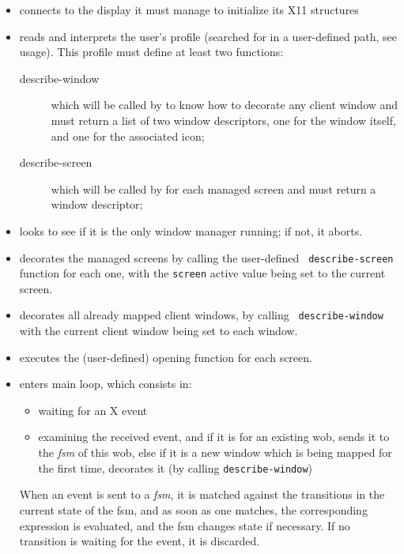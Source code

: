 \begin{itemize}

\item connects to the display it must manage to initialize its X11 structures

\item reads and interprets the user's {\WOOL} profile (searched for in a
user-defined path, see usage). This profile must define at least two
{\WOOL} functions:

\begin{description}
\item[describe-window] which will be called by {\GWM} to know how to decorate
any client window and must return a list of two window descriptors, one for
the window itself, and one for the associated icon;
\item[describe-screen] which will be called by {\GWM} for each managed
screen and must return a window descriptor;
\end{description}

\item looks to see if it is the only window manager running; if not, it
aborts.

\item decorates the managed screens by calling the user-defined {\tt
describe-screen} function for each one, with the \verb"screen" active value
being set to the current screen.

\item decorates all already mapped client windows, by calling {\tt
describe-window} with the current client window being set to each window.

\item executes the (user-defined) opening function for each screen.

\item enters {\GWM} main loop, which consists in:

\begin{itemize}
\item waiting for an X event

\item examining the received event, and if it is for an existing wob, sends
it to the {\em fsm\/} of this wob, else if it is a new window which is being
mapped for the first time, decorates it (by calling {\tt describe-window})
\end{itemize}

When an event is sent to a {\em fsm}, it is matched against the
transitions in the current state of the fsm, and as soon as one matches, the
corresponding {\WOOL} expression is evaluated, and the fsm changes state if
necessary. If no transition is waiting for the event, it is discarded.

\end{itemize}

